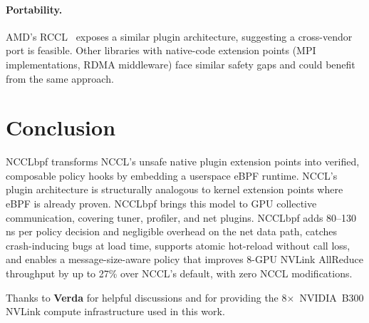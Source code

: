 \documentclass[sigplan,10pt]{acmart}
\newcommand{\sysname}{NCCLbpf\xspace}
\newcommand{\ns}{\,ns\xspace}
\begin{document}
\paragraph{Portability.}
AMD's RCCL~\cite{rccl} exposes a similar plugin architecture,
suggesting a cross-vendor port is feasible. Other libraries with
native-code extension points (MPI implementations, RDMA middleware)
face similar safety gaps and could benefit from the same approach.

\section{Conclusion}
\label{sec:conclusion}

\sysname transforms NCCL's unsafe
native plugin extension points into verified, composable policy
hooks by embedding a userspace eBPF runtime. NCCL's plugin
architecture is structurally analogous to kernel extension points
where eBPF is already proven. \sysname brings this model to GPU
collective communication, covering tuner, profiler, and net
plugins. \sysname adds 80--130\ns per policy decision and
negligible overhead on the net data path, catches crash-inducing
bugs at load time, supports atomic hot-reload without call loss,
and enables a message-size-aware policy that improves 8-GPU
NVLink AllReduce throughput by up to 27\% over NCCL's default, with
zero NCCL modifications.

\begin{acks}
Thanks to \textbf{Verda} for helpful discussions and for providing the
8$\times$~NVIDIA~B300 NVLink compute infrastructure used in this work.
\end{acks}

\balance


\end{document}
